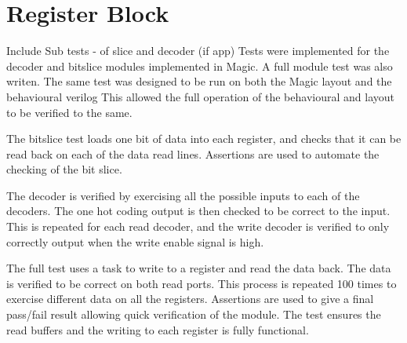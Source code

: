 
\section{Register Block}

Include Sub tests - of slice and decoder (if app)
Tests were implemented for the decoder and bitslice modules implemented in Magic. 
A full module test was also writen. 
The same test was designed to be run on both the Magic layout and the behavioural verilog
This allowed the full operation of the behavioural and layout to be verified to the same.

The bitslice test loads one bit of data into each register, and checks that it can be read back on each of the data read lines.
Assertions are used to automate the checking of the bit slice.

The decoder is verified by exercising all the possible inputs to each of the decoders.
The one hot coding output is then checked to be correct to the input.
This is repeated for each read decoder, and the write decoder is verified to only correctly output when the write enable signal is high. 

The full test uses a task to write to a register and read the data back.
The data is verified to be correct on both read ports.
This process is repeated 100 times to exercise different data on all the registers. 
Assertions are used to give a final pass/fail result allowing quick verification of the module.
The test ensures the read buffers and the writing to each register is fully functional.




